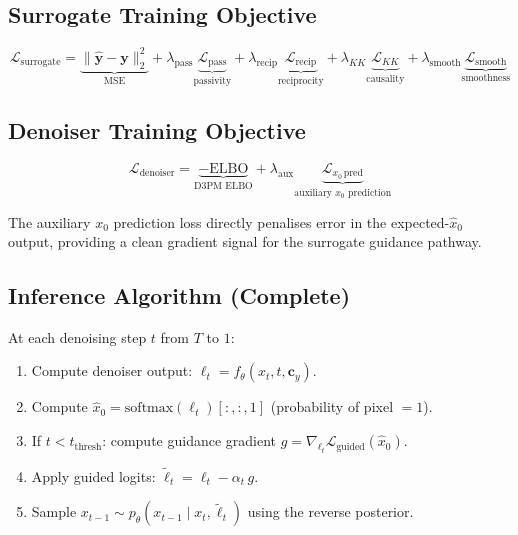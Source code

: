 \documentclass[12pt,a4paper]{article}
\newcommand{\yhat}{\hat{\mathbf{y}}}
\newcommand{\cy}{\mathbf{c}_y}
\newcommand{\tthresh}{t_{\mathrm{thresh}}}
\theoremstyle{definition}
\theoremstyle{plain}
\theoremstyle{remark}
\begin{document}
\subsection{Surrogate Training Objective}

\begin{equation}
  \mathcal{L}_{\mathrm{surrogate}}
  = \underbrace{\|\yhat - \mathbf{y}\|_2^2}_{\mathrm{MSE}}
  + \lambda_{\mathrm{pass}} \underbrace{\mathcal{L}_{\mathrm{pass}}}_{\mathrm{passivity}}
  + \lambda_{\mathrm{recip}} \underbrace{\mathcal{L}_{\mathrm{recip}}}_{\mathrm{reciprocity}}
  + \lambda_{KK} \underbrace{\mathcal{L}_{KK}}_{\mathrm{causality}}
  + \lambda_{\mathrm{smooth}} \underbrace{\mathcal{L}_{\mathrm{smooth}}}_{\mathrm{smoothness}}
  \label{eq:lsurr2}
\end{equation}

\subsection{Denoiser Training Objective}

\begin{equation}
  \mathcal{L}_{\mathrm{denoiser}}
  = \underbrace{-\mathrm{ELBO}}_{\text{D3PM ELBO}}
  + \lambda_{\mathrm{aux}}
    \underbrace{\mathcal{L}_{x_0\,\mathrm{pred}}}_{\text{auxiliary } x_0 \text{ prediction}}
  \label{eq:ldenoiser}
\end{equation}

The auxiliary $x_0$ prediction loss directly penalises error in the expected-$\hat{x}_0$
output, providing a clean gradient signal for the surrogate guidance pathway.

\subsection{Inference Algorithm (Complete)}

At each denoising step $t$ from $T$ to $1$:
\begin{enumerate}
  \item Compute denoiser output: $\ell_t = f_\theta(x_t, t, \cy)$.
  \item Compute $\hat{x}_0 = \mathrm{softmax}(\ell_t)[:,:,1]$
        (probability of pixel $= 1$).
  \item If $t < \tthresh$: compute guidance gradient
        $g = \nabla_{\ell_t}\mathcal{L}_{\mathrm{guided}}(\hat{x}_0)$.
  \item Apply guided logits: $\tilde{\ell}_t = \ell_t - \alpha_t\, g$.
  \item Sample $x_{t-1} \sim p_\theta(x_{t-1} \mid x_t, \tilde{\ell}_t)$
        using the reverse posterior.
\end{enumerate}
\end{document}
